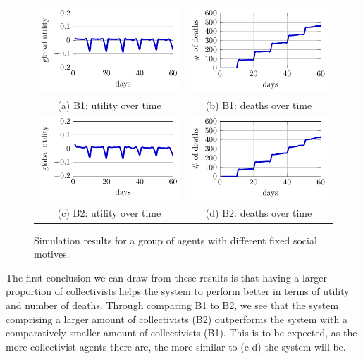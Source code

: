 \begin{figure}[H]
    \centering
    \begin{tabular}{cc}
    \includegraphics[width=0.3\linewidth]{008_team_6_agent_design/B/B1_utility.pdf} &   \includegraphics[width=0.3\linewidth]{008_team_6_agent_design/B/B1_deaths.pdf} \\[0pt]
    (a) B1: utility over time & (b) B1: deaths over time \\[8pt]
     \includegraphics[width=0.3\linewidth]{008_team_6_agent_design/B/B2_utility.pdf} &   \includegraphics[width=0.3\linewidth]{008_team_6_agent_design/B/B2_deaths.pdf} \\[0pt]
    (c) B2: utility over time & (d) B2: deaths over time
    \\[8pt]
    \end{tabular}
    \caption{Simulation results for a group of agents with different fixed social motives.}
    \label{fig:res_B}%
\end{figure}

The first conclusion we can draw from these results is that having a larger proportion of collectivists helps the system to perform better in terms of utility and number of deaths. Through comparing B1 to B2, we see that the system comprising a larger amount of collectivists (B2) outperforms the system with a comparatively smaller amount of collectivists (B1). This is to be expected, as the more collectivist agents there are, the more similar to  (c-d) the system will be.

